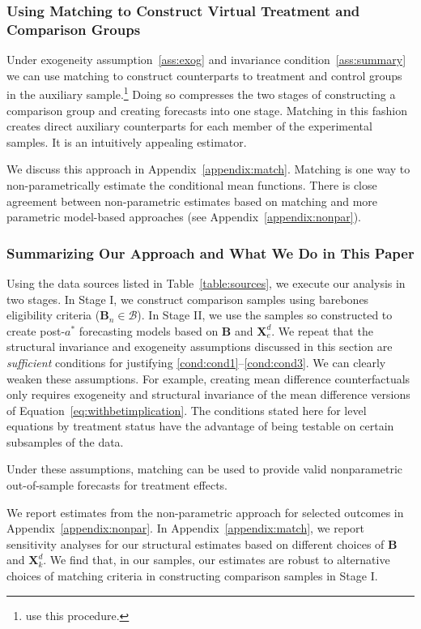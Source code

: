 \subsubsection{Using Matching to Construct Virtual Treatment and Comparison Groups}\label{usingmatching}

Under exogeneity assumption~\ref{ass:exog} and invariance condition~\ref{ass:summary} we can use matching to construct counterparts to treatment and control groups in the auxiliary sample.\footnote{\citet{Heckman_Ichimura_etal_1998_Econometrica} use this procedure.} Doing so compresses the two stages of constructing a comparison group and creating forecasts into one stage. Matching in this fashion creates direct auxiliary counterparts for each member of the experimental samples. It is an intuitively appealing estimator. 

We discuss this approach in Appendix~\ref{appendix:match}. Matching is one way to non-parametrically estimate the conditional mean functions. There is close agreement between non-parametric estimates based on matching and more parametric model-based approaches (see Appendix~\ref{appendix:nonpar}).

\subsubsection{Summarizing Our Approach and What We Do in This Paper}

Using the data sources listed in Table~\ref{table:sources}, we execute our analysis in two stages. In Stage I, we construct comparison samples using barebones eligibility criteria ($\bm{B}_n \in \mathcal{B}$). In Stage II, we use the samples so constructed to create post-$a^\ast$ forecasting models based on $\bm{B}$ and $\bm{X}^d_e$. We repeat that the structural invariance and exogeneity assumptions discussed in this section are \emph{sufficient} conditions for justifying \ref{cond:cond1}--\ref{cond:cond3}. We can clearly weaken these assumptions. For example, creating mean difference counterfactuals only requires exogeneity and structural invariance of the mean difference versions of Equation~\eqref{eq:withbetimplication}. The conditions stated here for level equations by treatment status have the advantage of being testable on certain subsamples of the data.

Under these assumptions, matching can be used to provide valid nonparametric out-of-sample forecasts for treatment effects.  

We report estimates from the non-parametric approach for selected outcomes in Appendix~\ref{appendix:nonpar}. In Appendix~\ref{appendix:match}, we report sensitivity analyses for our structural estimates based on different choices of $\bm{B}$ and $\bm{X}^d_k$. We find that, in our samples, our estimates are robust to alternative choices of matching criteria in constructing comparison samples in Stage I.

